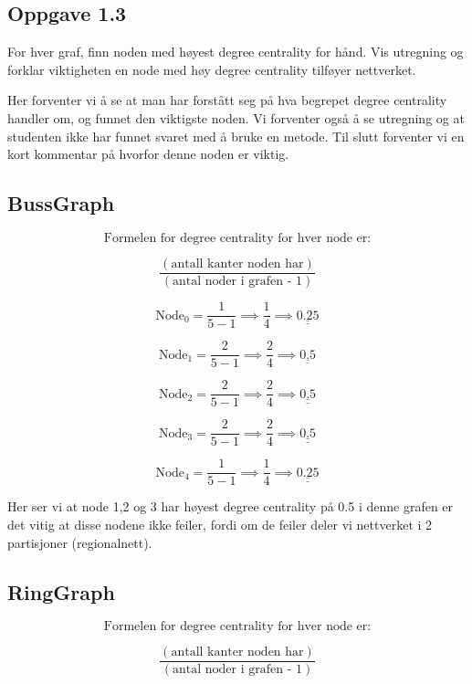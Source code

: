 \documentclass[11pt]{article}
\begin{document}
    \hypertarget{oppgave-1.3}{%
\subsection*{Oppgave 1.3}\label{oppgave-1.3}}

For hver graf, finn noden med høyest degree centrality for hånd. Vis
utregning og forklar viktigheten en node med høy degree centrality
tilføyer nettverket.

Her forventer vi å se at man har forstått seg på hva begrepet degree
centrality handler om, og funnet den viktigste noden. Vi forventer også
å se utregning og at studenten ikke har funnet svaret med å bruke en
metode. Til slutt forventer vi en kort kommentar på hvorfor denne noden
er viktig.

    \hypertarget{bussgraph}{%
\subsection*{BussGraph}\label{bussgraph}}

\[\text{Formelen for degree centrality for hver node er:}\]

\[\frac{(\text{antall kanter noden har})}{(\text{antal noder i grafen - 1})}\]

\[\text{Node}_0 = \frac{1}{5 - 1} \implies \frac{1}{4} \implies \underline{\underline{ 0.25}}\]

\[\text{Node}_1 = \frac{2}{5 - 1} \implies \frac{2}{4} \implies \underline{\underline{ 0.5}}\]

\[\text{Node}_2 = \frac{2}{5 - 1} \implies \frac{2}{4} \implies \underline{\underline{ 0.5}}\]

\[\text{Node}_3 = \frac{2}{5 - 1} \implies \frac{2}{4} \implies \underline{\underline{ 0.5}}\]

\[\text{Node}_4 = \frac{1}{5 - 1} \implies \frac{1}{4} \implies \underline{\underline{ 0.25}}\]

Her ser vi at node 1,2 og 3 har høyest degree centrality på 0.5 i denne
grafen er det vitig at disse nodene ikke feiler, fordi om de feiler
deler vi nettverket i 2 partisjoner (regionalnett).

    \hypertarget{ringgraph}{%
\subsection*{RingGraph}\label{ringgraph}}

\[\text{Formelen for degree centrality for hver node er:}\]

\[\frac{(\text{antall kanter noden har})}{(\text{antal noder i grafen - 1})}\]
\end{document}
